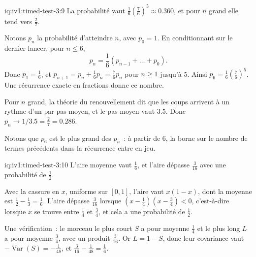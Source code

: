 \begin{solution}{iq:iv1:timed-test-3:9}
La probabilité vaut $\frac16(\frac76)^5 \approx 0.360$, et pour $n$ grand elle tend vers $\frac27$.

Notons $p_n$ la probabilité d'atteindre $n$, avec $p_0 = 1$. En conditionnant sur le dernier lancer, pour $n \le 6$,
\[
p_n = \frac16(p_{n - 1} + \dots + p_0).
\]
Donc $p_1 = \frac16$, et $p_{n + 1} = p_n + \frac16p_n = \frac76p_n$ pour $n \ge 1$ jusqu'à 5. Ainsi $p_6 = \frac16(\frac76)^5$. Une récurrence exacte en fractions donne ce nombre.

Pour $n$ grand, la théorie du renouvellement dit que les coups arrivent à un rythme d'un par pas moyen, et le pas moyen vaut $3.5$. Donc $p_n \to 1/3.5 = \frac27 = 0.286$.

Notons que $p_6$ est le plus grand des $p_n$~: à partir de 6, la borne sur le nombre de termes précédents dans la récurrence entre en jeu.

\end{solution}

\begin{solution}{iq:iv1:timed-test-3:10}
L'aire moyenne vaut $\frac16$, et l'aire dépasse $\frac{3}{16}$ avec une probabilité de $\frac12$.

Avec la cassure en $x$, uniforme sur $[0, 1]$, l'aire vaut $x(1 - x)$, dont la moyenne est $\frac12 - \frac13 = \frac16$. L'aire dépasse $\frac{3}{16}$ lorsque $(x - \frac14)(x - \frac34) < 0$, c'est-à-dire lorsque $x$ se trouve entre $\frac14$ et $\frac34$, et cela a une probabilité de $\frac12$.

Une vérification~: le morceau le plus court $S$ a pour moyenne $\frac14$ et le plus long $L$ a pour moyenne $\frac34$, avec un produit $\frac{3}{16}$. Or $L = 1 - S$, donc leur covariance vaut $-\operatorname{Var}(S) = -\frac{1}{48}$, et $\frac{3}{16} - \frac{1}{48} = \frac16$.


\end{solution}

